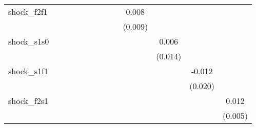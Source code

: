 {\begin{tabular}{l*{12}{c}}
\addlinespace
shock\_f2f1  &                     &                     &                     &                     &                     &                     &                     &                     &       0.008         &                     &                     &                     \\
            &                     &                     &                     &                     &                     &                     &                     &                     &     (0.009)         &                     &                     &                     \\
\addlinespace
shock\_s1s0  &                     &                     &                     &                     &                     &                     &                     &                     &                     &       0.006         &                     &                     \\
            &                     &                     &                     &                     &                     &                     &                     &                     &                     &     (0.014)         &                     &                     \\
\addlinespace
shock\_s1f1  &                     &                     &                     &                     &                     &                     &                     &                     &                     &                     &      -0.012         &                     \\
            &                     &                     &                     &                     &                     &                     &                     &                     &                     &                     &     (0.020)         &                     \\
\addlinespace
shock\_f2s1  &                     &                     &                     &                     &                     &                     &                     &                     &                     &                     &                     &       0.012\sym{**} \\
            &                     &                     &                     &                     &                     &                     &                     &                     &                     &                     &                     &     (0.005)         \\

\end{tabular}}
